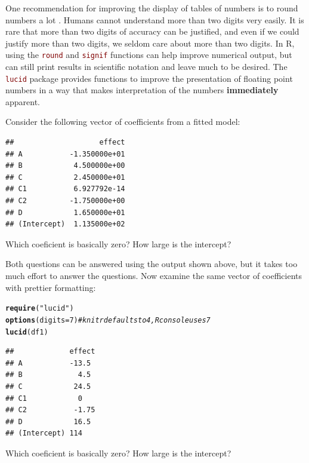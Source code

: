 \documentclass[12pt]{article}\usepackage[]{graphicx}\usepackage[]{color}
\makeatletter
\newcommand{\hlnum}[1]{\textcolor[rgb]{0.686,0.059,0.569}{#1}}%
\newcommand{\hlstr}[1]{\textcolor[rgb]{0.192,0.494,0.8}{#1}}%
\newcommand{\hlcom}[1]{\textcolor[rgb]{0.678,0.584,0.686}{\textit{#1}}}%
\newcommand{\hlstd}[1]{\textcolor[rgb]{0.345,0.345,0.345}{#1}}%
\newcommand{\hlkwc}[1]{\textcolor[rgb]{0.333,0.667,0.333}{#1}}%
\newcommand{\hlkwd}[1]{\textcolor[rgb]{0.737,0.353,0.396}{\textbf{#1}}}%
\newenvironment{kframe}{%
 \def\at@end@of@kframe{}%
 \ifinner\ifhmode%
  \def\at@end@of@kframe{\end{minipage}}%
  \begin{minipage}{\columnwidth}%
 \fi\fi%
 \def\FrameCommand##1{\hskip\@totalleftmargin \hskip-\fboxsep
 \colorbox{shadecolor}{##1}\hskip-\fboxsep
     \hskip-\linewidth \hskip-\@totalleftmargin \hskip\columnwidth}%
 \MakeFramed {\advance\hsize-\width
   \@totalleftmargin\z@ \linewidth\hsize
   \@setminipage}}%
 {\par\unskip\endMakeFramed%
 \at@end@of@kframe}
\newenvironment{knitrout}{}{} %
\newcommand{\code}[1]{\texttt{\textcolor{maroon}{#1}}}
\makeatother
\begin{document}
One recommendation for improving the display of tables of numbers
is to round numbers a lot \citep{wainer1997improving}.  Humans cannot
understand more than two digits very easily.  It is rare that more
than two digits of accuracy can be justified, and even if we could justify
more than two digits, we seldom care about more than two digits.
In R, using the \code{round} and \code{signif} functions can help improve
numerical output, but can still print results in scientific notation
and leave much to be desired.
The \code{lucid} package provides functions to improve the presentation of
floating point numbers in a way that makes interpretation of the numbers
{\bf immediately} apparent.

Consider the following vector of coefficients from a fitted model:
\begin{knitrout}
\color{fgcolor}\begin{kframe}
\begin{verbatim}
##                    effect
## A           -1.350000e+01
## B            4.500000e+00
## C            2.450000e+01
## C1           6.927792e-14
## C2          -1.750000e+00
## D            1.650000e+01
## (Intercept)  1.135000e+02
\end{verbatim}
\end{kframe}
\end{knitrout}
Which coeficient is basically zero?  How large is the intercept?

Both questions can be answered using the output shown above, but it
takes too much effort to answer the questions.  Now examine the same
vector of coefficients with prettier formatting:
\begin{knitrout}
\color{fgcolor}\begin{kframe}
\begin{alltt}
\hlkwd{require}\hlstd{(}\hlstr{"lucid"}\hlstd{)}
\hlkwd{options}\hlstd{(}\hlkwc{digits}\hlstd{=}\hlnum{7}\hlstd{)} \hlcom{# knitr defaults to 4, R console uses 7}
\hlkwd{lucid}\hlstd{(df1)}
\end{alltt}
\begin{verbatim}
##             effect
## A           -13.5 
## B             4.5 
## C            24.5 
## C1            0   
## C2           -1.75
## D            16.5 
## (Intercept) 114
\end{verbatim}
\end{kframe}
\end{knitrout}
Which coeficient is basically zero?  How large is the intercept?
\end{document}
